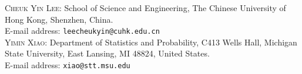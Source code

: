 \documentclass[11pt, reqno]{amsart}
\numberwithin{equation}{section}
\begin{document}
\bigskip

\textsc{Cheuk Yin Lee}: School of Science and Engineering, The Chinese University of Hong Kong, Shenzhen, China.\\
E-mail address: \texttt{leecheukyin@cuhk.edu.cn}\\

\textsc{Yimin Xiao}: Department of Statistics and Probability, C413 Wells Hall, Michigan State University, East Lansing, MI 48824, United States.\\
E-mail address: \texttt{xiao@stt.msu.edu}\\
\end{document}
